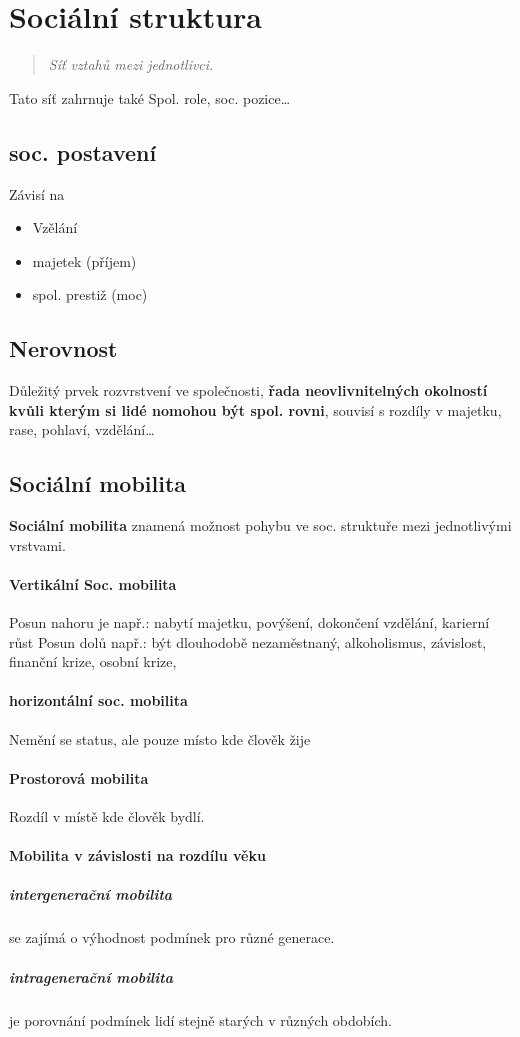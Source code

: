 \documentclass[10pt,a4paper,
twoside,%
]{report}
\begin{document}
\section{Sociální struktura}
\begin{quote}
\emph{Síť vztahů mezi jednotlivci.}
\end{quote}
Tato síť zahrnuje také Spol. role, soc. pozice\ldots
\subsection*{soc. postavení} 
Závisí na \begin{itemize}
\item Vzělání
\item majetek (příjem)
\item spol. prestiž (moc)
\end{itemize}
\subsection*{Nerovnost} 
Důležitý prvek rozvrstvení ve společnosti, \textbf{řada neovlivnitelných okolností kvůli kterým si lidé nomohou být spol. rovni}, souvisí s rozdíly  v majetku, rase, pohlaví, vzdělání\ldots 
\subsection{Sociální mobilita}
\textbf{Sociální mobilita} znamená možnost pohybu ve soc. struktuře mezi jednotlivými vrstvami.
\paragraph{Vertikální Soc. mobilita}
Posun nahoru je např.: nabytí majetku, povýšení, dokončení vzdělání, karierní růst
Posun dolů např.: být dlouhodobě nezaměstnaný, alkoholismus, závislost, finanční krize, osobní krize, 
\paragraph{horizontální soc. mobilita}
Nemění se status, ale pouze místo kde člověk žije
\paragraph{Prostorová mobilita} 
Rozdíl v místě kde člověk bydlí.
\paragraph{Mobilita v závislosti na rozdílu věku}
\subparagraph{intergenerační mobilita} se zajímá o výhodnost podmínek pro různé generace.
\subparagraph{intragenerační mobilita} je porovnání podmínek  lidí stejně starých v různých obdobích.
\end{document}
